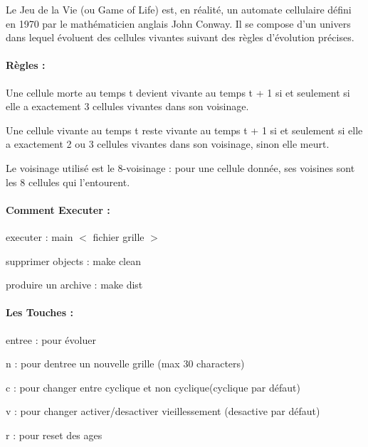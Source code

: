 Le Jeu de la Vie (ou Game of Life) est, en réalité, un automate cellulaire défini en 1970 par le mathématicien anglais John Conway. Il se compose d’un univers dans lequel évoluent des cellules vivantes suivant des règles d’évolution précises.

\paragraph*{Règles \+:}


\begin{DoxyItemize}
\item Une cellule morte au temps t devient vivante au temps t + 1 si et seulement si elle a exactement 3 cellules vivantes dans son voisinage.
\item Une cellule vivante au temps t reste vivante au temps t + 1 si et seulement si elle a exactement 2 ou 3 cellules vivantes dans son voisinage, sinon elle meurt.
\item Le voisinage utilisé est le 8-\/voisinage \+: pour une cellule donnée, ses voisines sont les 8 cellules qui l’entourent.
\end{DoxyItemize}

\paragraph*{Comment Executer \+:}


\begin{DoxyItemize}
\item executer \+: main $<$ fichier grille $>$
\item supprimer objects \+: make clean
\item produire un archive \+: make dist
\end{DoxyItemize}

\paragraph*{Les Touches \+:}


\begin{DoxyItemize}
\item entree \+: pour évoluer
\item n \+: pour d\textquotesingle{}entree un nouvelle grille (max 30 characters)
\item c \+: pour changer entre cyclique et non cyclique(cyclique par défaut)
\item v \+: pour changer activer/desactiver vieillessement (desactive par défaut)
\item r \+: pour reset des ages
\end{DoxyItemize}

